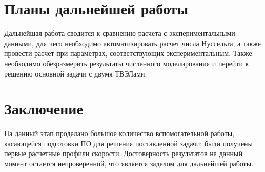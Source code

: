 \section{Планы дальнейшей работы}

Дальнейшая работа сводится к сравнению расчета с экспериментальными данными, для чего необходимо автоматизировать расчет числа Нуссельта, а также провести расчет при параметрах, соответствующих экспериментальным. Также необходимо обезразмерить результаты численного моделирования и перейти к решению основной задачи с двумя ТВЭЛами.

\section{Заключение}

На данный этап проделано большое количество вспомогательной работы, касающейся подготовки ПО для решения поставленной задачи; были получены первые расчетные профили скорости. Достоверность результатов на данный момент остается непроверенной, что является заделом для дальнейшей работы.

\begin{thebibliography}{4}
	
\end{thebibliography}

